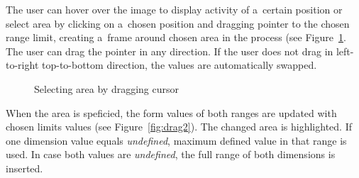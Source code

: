 The user can hover over the image to display activity of a~certain position
or select area by clicking on a~chosen position and dragging pointer to the chosen
range limit, creating a~frame around chosen area in the process (see Figure~\ref{fig:drag1}.
The user can drag the pointer in any direction. If the user does not drag
in left-to-right top-to-bottom direction, the values are automatically swapped.

\begin{figure}[H]
   \begin{center}
		 \hfill
      \caption{Selecting area by dragging cursor} \label{fig:drag1}
	\end{center}
\end{figure}

When the area is speficied, the form values of both ranges are updated with chosen limits values
(see Figure~\ref{fig:drag2}). The changed area is highlighted.
If one dimension value equals \textit{undefined}, maximum defined value
in that range is used. In case both values are \textit{undefined}, the full range
of both dimensions is inserted.

